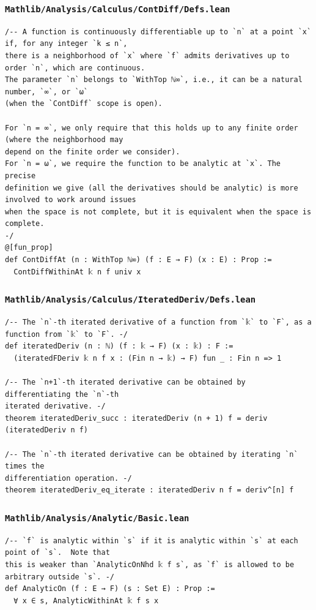 \subsubsection{\texttt{Mathlib/Analysis/Calculus/ContDiff/Defs.lean}}
\begin{lstlisting}[language=lean]
/-- A function is continuously differentiable up to `n` at a point `x` if, for any integer `k ≤ n`,
there is a neighborhood of `x` where `f` admits derivatives up to order `n`, which are continuous.
The parameter `n` belongs to `WithTop ℕ∞`, i.e., it can be a natural number, `∞`, or `ω`
(when the `ContDiff` scope is open).

For `n = ∞`, we only require that this holds up to any finite order (where the neighborhood may
depend on the finite order we consider).
For `n = ω`, we require the function to be analytic at `x`. The precise
definition we give (all the derivatives should be analytic) is more involved to work around issues
when the space is not complete, but it is equivalent when the space is complete.
-/
@[fun_prop]
def ContDiffAt (n : WithTop ℕ∞) (f : E → F) (x : E) : Prop :=
  ContDiffWithinAt 𝕜 n f univ x
\end{lstlisting}

\subsubsection{\texttt{Mathlib/Analysis/Calculus/IteratedDeriv/Defs.lean}}
\begin{lstlisting}[language=lean]
/-- The `n`-th iterated derivative of a function from `𝕜` to `F`, as a function from `𝕜` to `F`. -/
def iteratedDeriv (n : ℕ) (f : 𝕜 → F) (x : 𝕜) : F :=
  (iteratedFDeriv 𝕜 n f x : (Fin n → 𝕜) → F) fun _ : Fin n => 1

/-- The `n+1`-th iterated derivative can be obtained by differentiating the `n`-th
iterated derivative. -/
theorem iteratedDeriv_succ : iteratedDeriv (n + 1) f = deriv (iteratedDeriv n f)

/-- The `n`-th iterated derivative can be obtained by iterating `n` times the
differentiation operation. -/
theorem iteratedDeriv_eq_iterate : iteratedDeriv n f = deriv^[n] f
\end{lstlisting}

\subsubsection{\texttt{Mathlib/Analysis/Analytic/Basic.lean}}
\begin{lstlisting}[language=lean]
/-- `f` is analytic within `s` if it is analytic within `s` at each point of `s`.  Note that
this is weaker than `AnalyticOnNhd 𝕜 f s`, as `f` is allowed to be arbitrary outside `s`. -/
def AnalyticOn (f : E → F) (s : Set E) : Prop :=
  ∀ x ∈ s, AnalyticWithinAt 𝕜 f s x
\end{lstlisting}

